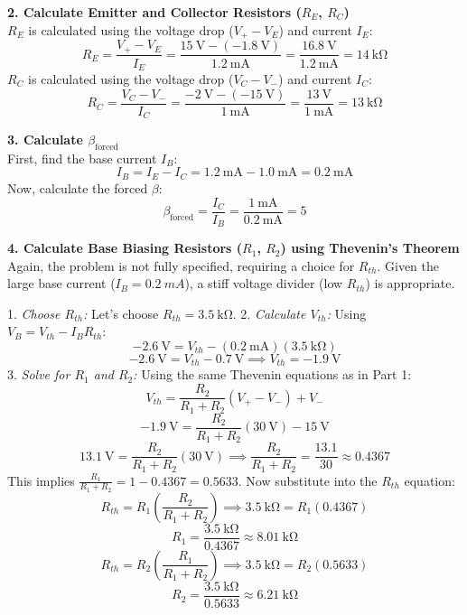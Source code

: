 \documentclass[11pt]{article}
\begin{document}
\textbf{2. Calculate Emitter and Collector Resistors ($R_E$, $R_C$)} \\
$R_E$ is calculated using the voltage drop ($V_+ - V_E$) and current $I_E$:
$$
R_E = \frac{V_{+} - V_E}{I_E} = \frac{\SI{15}{\volt} - (\SI{-1.8}{\volt})}{\SI{1.2}{\milli\ampere}} = \frac{\SI{16.8}{\volt}}{\SI{1.2}{\milli\ampere}} = \SI{14}{\kilo\ohm}
$$
$R_C$ is calculated using the voltage drop ($V_C - V_-$) and current $I_C$:
$$
R_C = \frac{V_C - V_{-}}{I_C} = \frac{\SI{-2}{\volt} - (\SI{-15}{\volt})}{\SI{1}{\milli\ampere}} = \frac{\SI{13}{\volt}}{\SI{1}{\milli\ampere}} = \SI{13}{\kilo\ohm}
$$

\textbf{3. Calculate $\beta_{\text{forced}}$} \\
First, find the base current $I_B$:
$$
I_B = I_E - I_C = \SI{1.2}{\milli\ampere} - \SI{1.0}{\milli\ampere} = \SI{0.2}{\milli\ampere}
$$
Now, calculate the forced $\beta$:
$$
\beta_{\text{forced}} = \frac{I_C}{I_B} = \frac{\SI{1}{\milli\ampere}}{\SI{0.2}{\milli\ampere}} = 5
$$

\textbf{4. Calculate Base Biasing Resistors ($R_1$, $R_2$) using Thevenin's Theorem} \\
Again, the problem is not fully specified, requiring a choice for $R_{th}$. Given the large base current ($I_B = \SI{0.2}{mA}$), a stiff voltage divider (low $R_{th}$) is appropriate.

1.  \textit{Choose $R_{th}$:} Let's choose $R_{th} = \SI{3.5}{\kilo\ohm}$.
2.  \textit{Calculate $V_{th}$:} Using $V_B = V_{th} - I_B R_{th}$:
    $$
    \SI{-2.6}{\volt} = V_{th} - (\SI{0.2}{\milli\ampere})(\SI{3.5}{\kilo\ohm})
    $$
    $$
    \SI{-2.6}{\volt} = V_{th} - \SI{0.7}{\volt} \implies V_{th} = \SI{-1.9}{\volt}
    $$
3.  \textit{Solve for $R_1$ and $R_2$:} Using the same Thevenin equations as in Part 1:
    $$ V_{th} = \frac{R_2}{R_1+R_2}(V_+ - V_-) + V_- $$
    $$ \SI{-1.9}{\volt} = \frac{R_2}{R_1+R_2}(\SI{30}{\volt}) - \SI{15}{\volt} $$
    $$ \SI{13.1}{\volt} = \frac{R_2}{R_1+R_2}(\SI{30}{\volt}) \implies \frac{R_2}{R_1+R_2} = \frac{13.1}{30} \approx 0.4367 $$
    This implies $\frac{R_1}{R_1+R_2} = 1 - 0.4367 = 0.5633$.
    Now substitute into the $R_{th}$ equation:
    $$ R_{th} = R_1 \left(\frac{R_2}{R_1+R_2}\right) \implies \SI{3.5}{\kilo\ohm} = R_1 (0.4367) $$
    $$ R_1 = \frac{\SI{3.5}{\kilo\ohm}}{0.4367} \approx \SI{8.01}{\kilo\ohm} $$
    $$ R_{th} = R_2 \left(\frac{R_1}{R_1+R_2}\right) \implies \SI{3.5}{\kilo\ohm} = R_2 (0.5633) $$
    $$ R_2 = \frac{\SI{3.5}{\kilo\ohm}}{0.5633} \approx \SI{6.21}{\kilo\ohm} $$
\end{document}
